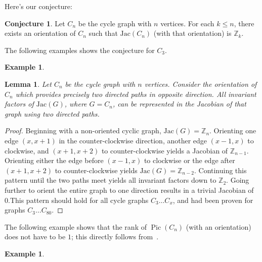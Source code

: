 \documentclass[11pt,reqno]{amsart}
\DeclareMathOperator{\Pic}{Pic}
\newcommand{\Jac}{\textrm{Jac}}{}
\theoremstyle{definition}
\newtheorem{myeg}[mydef]{\textbf{Example}}
\newtheorem{conj}[mydef]{\textbf{Conjecture}}
\theoremstyle{plain}
\newtheorem{lem}[mydef]{\textbf{Lemma}}
\begin{document}
	Here's our conjecture:
	\begin{conj}
		Let $C_n$ be the cycle graph with $n$ vertices. For each $k \leq n$, there exists an orientation of $C_n$
		such that $\Jac(C_n)$ (with that orientation) is $\mathbb{Z}_k$.
	\end{conj}

	The following examples shows the conjecture for $C_3$.

	\begin{myeg}


	\end{myeg}

	\begin{lem}
		Let $C_n$ be the cycle graph with $n$ vertices. Consider the orientation of $C_n$ which provides precisely
		two directed paths in opposite direction. All invariant factors of $\Jac(G)$, where $G = C_n$, can
		be represented in the Jacobian of that graph using two directed paths.
	\end{lem}
	\begin{proof}
		Beginning with a non-oriented cyclic graph, $\Jac(G) = \mathbb{Z}_n$.
		Orienting one edge $(x, x+1)$ in the counter-clockwise direction, another edge $(x-1, x)$ to clockwise,
		and $(x+1, x+2)$ to counter-clockwise yields a Jacobian of $\mathbb{Z}_{n-1}$.
		Orienting either the edge before $(x-1, x)$ to clockwise or the edge after $(x+1, x+2)$ to
		counter-clockwise yields $\Jac(G) = \mathbb{Z}_{n-2}$.  Continuing this pattern until the two paths
		meet yields all invariant factors down to $\mathbb{Z}_2$.  Going further to orient the entire
		graph to one direction results in a trivial Jacobian of ${0}$.This pattern should hold for all
		cycle graphs $C_3 \dots C_x$, and had been proven for graphs $C_3 \dots C_{80}$.
	\end{proof}

	The following example shows that the rank of $\Pic(C_n)$ (with an orientation) does not have to be $1$;
	this directly follows from~\cite[Corollary 3.5]{wagner2000critical}.

	\begin{myeg}
	\end{myeg}
\end{document}
